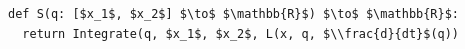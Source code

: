\documentclass[border=10pt]{standalone}
\begin{document}
\begin{lstlisting}
def S(q: [$x_1$, $x_2$] $\to$ $\mathbb{R}$) $\to$ $\mathbb{R}$:
  return Integrate(q, $x_1$, $x_2$, L(x, q, $\\frac{d}{dt}$(q))
\end{lstlisting}
\end{document}
